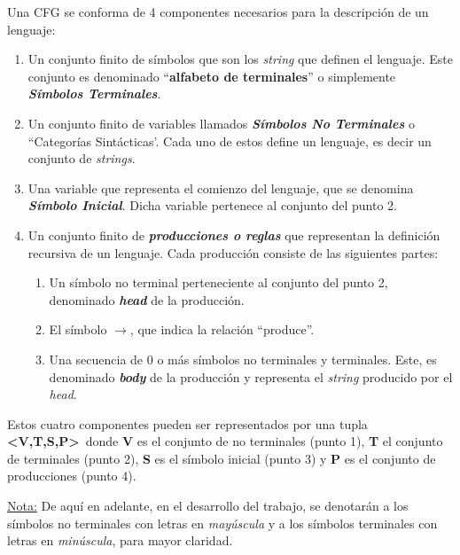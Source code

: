 \begin{definition}
Una CFG se conforma de 4 componentes necesarios para la descripción de un lenguaje:

\begin{enumerate}
\item Un conjunto finito de símbolos que son los \textit{string} que definen el lenguaje. Este conjunto es denominado ``\textbf{alfabeto de terminales}'' o simplemente \textit{\textbf{Símbolos Terminales}}.

\item Un conjunto finito de variables llamados \textit{\textbf{Símbolos No Terminales}} o ``Categorías Sintácticas'. Cada uno de estos define un lenguaje, es decir un conjunto de \textit{strings}.

\item Una variable que representa el comienzo del lenguaje, que se denomina \textit{\textbf{Símbolo Inicial}}. Dicha variable pertenece al conjunto del punto 2.

\item Un conjunto finito de \textit{\textbf{producciones o reglas}} que representan la definición recursiva de un lenguaje. Cada producción consiste de las siguientes partes:

\begin{enumerate}
\item Un símbolo no terminal perteneciente al conjunto del punto 2, denominado \textit{\textbf{head}} de la producción.

\item El símbolo \textbf{$\rightarrow$}, que indica la relación ``produce''.

\item Una secuencia de $0$ o más símbolos no terminales y terminales. Este, es denominado \textit{\textbf{body}} de la producción y representa el \textit{string} producido por el \textit{head}.
\end{enumerate}
\end{enumerate}

Estos cuatro componentes pueden ser representados por una tupla \textbf{<V,T,S,P>}\ donde \textbf{V} es el conjunto de no terminales (punto 1), \textbf{T} el conjunto de terminales (punto 2), \textbf{S} es el símbolo inicial (punto 3) y \textbf{P} es el conjunto de producciones (punto 4).
\end{definition}

\underline{Nota:}
De aquí en adelante, en el desarrollo del trabajo, se denotarán a los símbolos no terminales con letras en \textit{mayúscula} y a los símbolos terminales con letras en \textit{minúscula}, para mayor claridad.

